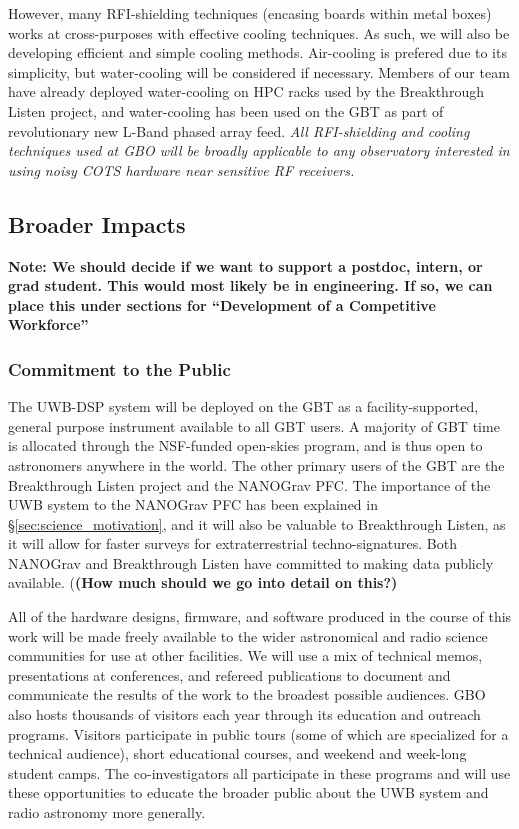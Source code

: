 \documentclass[10pt]{myNSF}
\begin{document}
However, many RFI-shielding techniques (encasing boards within metal
boxes) works at cross-purposes with effective cooling techniques. As
such, we will also be developing efficient and simple cooling methods.
Air-cooling is prefered due to its simplicity, but water-cooling will
be considered if necessary.  Members of our team have already deployed
water-cooling on HPC racks used by the Breakthrough Listen project,
and water-cooling has been used on the GBT as part of revolutionary
new L-Band phased array feed.  \emph{All RFI-shielding and cooling
  techniques used at GBO will be broadly applicable to any observatory
  interested in using noisy COTS hardware near sensitive RF
  receivers.}

\subsection{Broader Impacts}
\label{sec:BI}

\textbf{Note: We should decide if we want to support a postdoc,
  intern, or grad student.  This would most likely be in engineering.
  If so, we can place this under sections for ``Development of a
  Competitive Workforce''}

\subsubsection{Commitment to the Public}
\label{sec:commitment}

The UWB-DSP system will be deployed on the GBT as a
facility-supported, general purpose instrument available to all GBT
users.  A majority of GBT time is allocated through the NSF-funded
open-skies program, and is thus open to astronomers anywhere in the
world.  The other primary users of the GBT are the Breakthrough Listen
project and the NANOGrav PFC.  The importance of the UWB system to the
NANOGrav PFC has been explained in \S\ref{sec:science_motivation}, and
it will also be valuable to Breakthrough Listen, as it will allow for
faster surveys for extraterrestrial techno-signatures.  Both NANOGrav
and Breakthrough Listen have committed to making data publicly
available. (\textbf{(How much should we go into detail on this?)}

All of the hardware designs, firmware, and software produced in the
course of this work will be made freely available to the wider
astronomical and radio science communities for use at other
facilities.  We will use a mix of technical memos, presentations at
conferences, and refereed publications to document and communicate the
results of the work to the broadest possible audiences.  GBO also
hosts thousands of visitors each year through its education and
outreach programs.  Visitors participate in public tours (some of
which are specialized for a technical audience), short educational
courses, and weekend and week-long student camps.  The
co-investigators all participate in these programs and will use these
opportunities to educate the broader public about the UWB system and
radio astronomy more generally.
\end{document}
